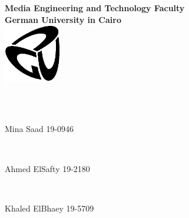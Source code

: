\newcommand{\titlePage}{

\thispagestyle{empty}

\begin{center}
	
	\textbf{Media Engineering and Technology Faculty}\\[1mm]
	\textbf{German University in Cairo}\\[1mm]
	
\includegraphics[width=2.5cm]{GUC-logo-ss.eps}


	
	\vspace{2cm}
	\doublespacing
	{\Huge \textbf{\titleOfThesisOne}}\\
	\singlespacing
	\vspace{2cm}
	{\large \textbf{\typeOfThesis}}\\
	
	\vfill
	\parbox{1cm}{
  		\begin{large}
    			\begin{tabbing}
       			\centerline{Mina Saad 19-0946}\\
				\centerline{Ahmed ElSafty 19-2180}\\       			
       			\centerline{Khaled ElBhaey 19-5709}
    			\end{tabbing}
  		\end{large}
	}\\
\end{center}
\clearpage
}
\titlePage

